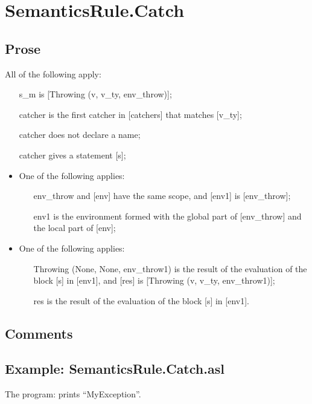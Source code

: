 \documentclass{book}
\begin{document}
\section{SemanticsRule.Catch \label{sec:SemanticsRule.Catch}}

    \subsection{Prose}
    All of the following apply:
    \begin{itemize}
    \item [s\_m] is [Throwing (v, v\_ty, env\_throw)];
    \item [catcher] is the first catcher in [catchers] that matches [v\_ty];
    \item [catcher] does not declare a name;
    \item [catcher] gives a statement [s];
    \item One of the following applies:
      \begin{itemize}
      \item [env\_throw] and [env] have the same scope, and [env1] is [env\_throw];
      \item [env1] is the environment formed with the global part of [env\_throw]
        and the local part of [env];
      \end{itemize}
    \item One of the following applies:
      \begin{itemize}
      \item [Throwing (None, None, env\_throw1)] is the result of the evaluation of
        the block [s] in [env1], and [res] is [Throwing (v, v\_ty, env\_throw1)];
      \item [res] is the result of the evaluation of the block [s] in [env1].
      \end{itemize}
    \end{itemize}

    \subsection{Comments}

    \subsection{Example: SemanticsRule.Catch.asl}
    The program:
    prints ``MyException''.
\end{document}
